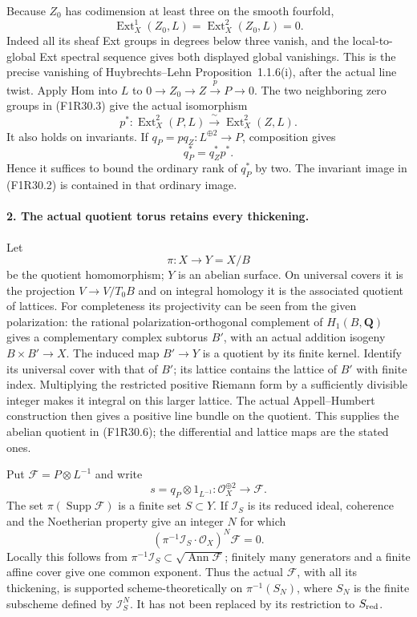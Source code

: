 Because $Z_0$ has codimension at least
three on the smooth fourfold,
\[
       \operatorname{Ext}^1_X(Z_0,L)
          =\operatorname{Ext}^2_X(Z_0,L)=0.
 \tag{F1R30.3}
\]
Indeed all its sheaf Ext groups in degrees
below three vanish, and the local-to-global
Ext spectral sequence gives both displayed
global vanishings. This is the precise
vanishing of Huybrechts--Lehn
Proposition~1.1.6(i), after the actual
line twist. Apply Hom into $L$ to
$0\to Z_0\to Z\xrightarrow{p}P\to0$.
The two neighboring zero groups in
(F1R30.3) give the actual isomorphism
\[
 p^*:\operatorname{Ext}^2_X(P,L)
                    \xrightarrow{\ \sim\ }
                    \operatorname{Ext}^2_X(Z,L).
 \tag{F1R30.4}
\]
It also holds on invariants. If
$q_P=pq_Z:L^{\oplus2}\to P$, composition
gives
\[
                       q_P^*=q_Z^*p^*.
 \tag{F1R30.5}
\]
Hence it suffices to bound the ordinary
rank of $q_P^*$ by two. The invariant
image in (F1R30.2) is contained in that
ordinary image.

\paragraph{2. The actual quotient torus retains every thickening.}
Let
\[
                    \pi:X\longrightarrow Y=X/B
 \tag{F1R30.6}
\]
be the quotient homomorphism; $Y$ is
an abelian surface. On universal covers
it is the projection $V\to V/T_0B$
and on integral homology it is the
associated quotient of lattices.
For completeness its projectivity can
be seen from the given polarization:
the rational polarization-orthogonal
complement of $H_1(B,\mathbf Q)$ gives
a complementary complex subtorus $B'$,
with an actual addition isogeny
$B\times B'\to X$. The induced map
$B'\to Y$ is a quotient by its finite
kernel. Identify its universal cover with
that of $B'$; its lattice contains the
lattice of $B'$ with finite index.
Multiplying the restricted positive
Riemann form by a sufficiently divisible
integer makes it integral on this larger
lattice. The actual Appell--Humbert
construction then gives a positive line
bundle on the quotient. This supplies the
abelian quotient in (F1R30.6);
the differential and lattice maps
are the stated ones.

Put $\mathcal F=P\otimes L^{-1}$
and write
\[
          s=q_P\otimes1_{L^{-1}}:
                      \mathcal O_X^{\oplus2}\longrightarrow\mathcal F.
 \tag{F1R30.7}
\]
The set $\pi(\operatorname{Supp}\mathcal F)$
is a finite set $S\subset Y$.
If $\mathcal I_S$ is its reduced ideal,
coherence and the Noetherian property
give an integer $N$ for which
\[
                   (\pi^{-1}\mathcal I_S\cdot\mathcal O_X)^N
                                      \mathcal F=0.
 \tag{F1R30.8}
\]
Locally this follows from
$\pi^{-1}\mathcal I_S\subset
\sqrt{\operatorname{Ann}\mathcal F}$;
finitely many generators and a finite
affine cover give one common exponent.
Thus the actual $\mathcal F$, with
all its thickening, is supported
scheme-theoretically on
$\pi^{-1}(S_N)$, where $S_N$ is the
finite subscheme defined by
$\mathcal I_S^N$. It has not been
replaced by its restriction to $S_{\rm red}$.

